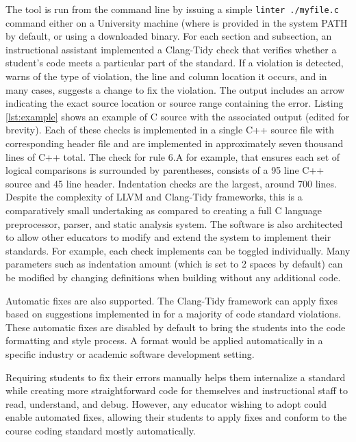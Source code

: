 \documentclass[sigconf]{acmart}
\begin{document}
The tool is run from the command line by issuing a simple \texttt{linter ./myfile.c} command either on a
University machine (where \tool{} is provided in the system PATH by default, or using a downloaded binary.
For each section and subsection, an instructional assistant implemented a Clang-Tidy check that verifies
whether a student's code meets a particular part of the standard. If a violation is detected,
\tool{} warns of the type of violation, the line and column location it occurs, and in
many cases, suggests a change to fix the violation.  The output includes an arrow
indicating the exact source location or source range containing the error. Listing \ref{lst:example} shows an example of C source with the associated output (edited for brevity). Each of these checks is implemented in a single
C++ source file with corresponding header file and are implemented in approximately seven thousand
lines of C++ total. The check for rule 6.A for example, that ensures each set of logical comparisons is surrounded by parentheses, consists of a 95 line C++ source and 45 line header. Indentation checks are the largest, around 700 lines. Despite the complexity of LLVM and Clang-Tidy frameworks, this is a comparatively small undertaking
as compared to creating a full C language preprocessor, parser, and static analysis system. The software is also architected to allow other educators to modify and extend the system to implement their 
standards. For example, each check \tool{} implements can be toggled individually. Many parameters such
as indentation amount (which is set to 2 spaces by default) can be modified by changing
definitions when building without any additional code.

Automatic fixes are also supported. The Clang-Tidy framework can apply fixes based on suggestions implemented in \tool{} for a majority of code standard violations. These automatic fixes are disabled by default to bring the
students into the code formatting and style process. A format would be applied automatically in a specific industry or academic software development setting.

Requiring students to fix their errors manually helps them internalize a standard while creating more straightforward code for themselves
and instructional staff to read, understand, and debug. However,
any educator wishing to adopt \tool{} could enable automated fixes, allowing their students to apply fixes and conform to the course coding standard mostly automatically. 
\end{document}
